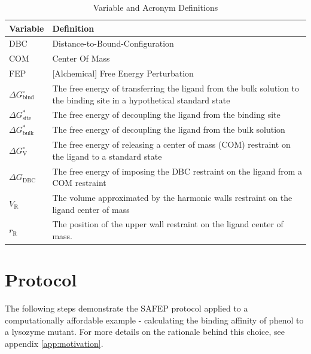 \documentclass[9pt,tutorial]{Styling/livecoms}
\begin{document}
\begin{table}[ht]
    \centering
    \caption{Variable and Acronym Definitions}
    \label{tab:variables}
    \begin{tabular}{  p{.2\linewidth} | p{.7\linewidth}  }
        Variable & Definition\\
        \hline
        DBC & Distance-to-Bound-Configuration \\
        \hline
        COM & Center Of Mass \\
        \hline
        [A]FEP & [Alchemical] Free Energy Perturbation \\
        \hline
        $\Delta G^\circ_\mathrm{bind}$ & The free energy of transferring the ligand from the bulk solution to the binding site in a hypothetical standard state\\
        \hline 
        $\Delta G^*_\mathrm{site}$ & The free energy of decoupling the ligand from the binding site \\
        \hline 
        $\Delta G^*_\mathrm{bulk}$ & The free energy of decoupling the ligand from the bulk solution \\
        \hline 
        $\Delta G^\circ_\mathrm{V}$ & The free energy of releasing a center of mass (COM) restraint on the ligand to a standard state\\
        \hline 
        $\Delta G_\mathrm{DBC}$ & The free energy of imposing the DBC restraint on the ligand from a COM restraint \\
        \hline
        $V_\mathrm{R}$ & The volume approximated by the harmonic walls restraint on the ligand center of mass\\
        \hline
        $r_\mathrm{R}$ & The position of the upper wall restraint on the ligand center of mass.
    \end{tabular}
\end{table}



\onecolumn
\section{Protocol} \label{sec:protocol}
\vspace{0.5em}

The following steps demonstrate the SAFEP protocol applied to a computationally affordable example - calculating the binding affinity of phenol to a lysozyme mutant.
For more details on the rationale behind this choice, see appendix \ref{app:motivation}.
\end{document}
